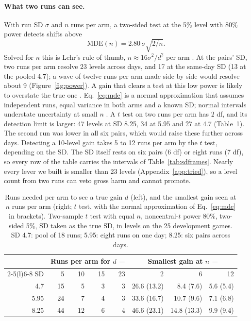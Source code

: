 \paragraph{What two runs can see.}
With run SD $\sigma$ and $n$ runs per arm, a two-sided test at the 5\% level with 80\% power detects shifts above
\begin{equation}\label{eq:mde}
\mathrm{MDE}(n) = 2.80\,\sigma\sqrt{2/n}.
\end{equation}
Solved for $n$ this is Lehr's rule of thumb, $n\approx16\sigma^2/d^2$ per arm \citep{lehr1992sixteen}.
At the pairs' SD, two runs per arm resolve 23 levels across days, and 17 at the same-day SD (13 at the pooled 4.7); a wave of twelve runs per arm made side by side would resolve about 9 (Figure~\ref{fig:power}). A gain that clears a test at this low power is likely to overstate the true one \citep{gelman2014beyond}. %
Eq.~\ref{eq:mde} is a normal approximation that assumes independent runs, equal variance in both arms and a known SD; normal intervals understate uncertainty at small $n$ \citep{bowyer2025clt}. A $t$ test on two runs per arm has 2 df, and its detection limit is larger: 47 levels at SD 8.25, 34 at 5.95 and 27 at 4.7 (Table~\ref{tab:runsneeded}). The second run was lower in all six pairs, which would raise these further across days. %
Detecting a 10-level gain takes 5 to 12 runs per arm by the $t$ test, depending on the SD. The SD itself rests on six pairs (6 df) or eight runs (7 df), so every row of the table carries the intervals of Table~\ref{tab:sdframes}.
Nearly every lever we built is smaller than 23 levels (Appendix~\ref{app:tried}), so a level count from two runs can veto gross harm and cannot promote. %

\begin{table}[t]
\caption{Runs needed per arm to see a true gain $d$ (left), and the smallest gain seen at $n$ runs per arm (right; $t$ test, with the normal approximation of Eq.~\ref{eq:mde} in brackets). Two-sample $t$ test with equal $n$, noncentral-$t$ power 80\%, two-sided 5\%, SD taken as the true SD, in levels on the 25 development games. SD 4.7: pool of 18 runs; 5.95: eight runs on one day; 8.25: six pairs across days.}\label{tab:runsneeded} %
\centering\footnotesize
\setlength{\tabcolsep}{3.5pt}
\begin{tabular}{@{}rrrrrrrr@{}}
\toprule
 & \multicolumn{4}{c}{Runs per arm for $d$ =} & \multicolumn{3}{c}{Smallest gain at $n$ =} \\
\cmidrule(lr){2-5}\cmidrule(l){6-8}
SD & 5 & 10 & 15 & 23 & 2 & 6 & 12 \\
\midrule
4.7 & 15 & 5 & 3 & 3 & 26.6 (13.2) & 8.4 (7.6) & 5.6 (5.4) \\
5.95 & 24 & 7 & 4 & 3 & 33.6 (16.7) & 10.7 (9.6) & 7.1 (6.8) \\
8.25 & 44 & 12 & 6 & 4 & 46.6 (23.1) & 14.8 (13.3) & 9.9 (9.4) \\
\bottomrule
\end{tabular}
\end{table}

